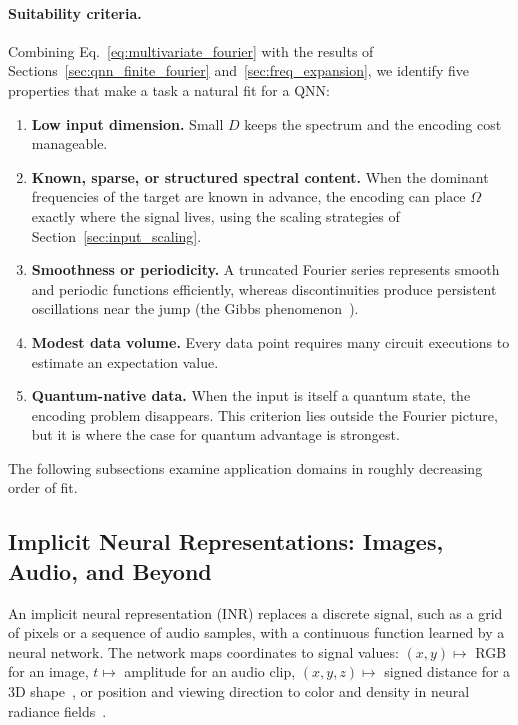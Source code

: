 \documentclass[12pt]{article}
\numberwithin{equation}{section}  %
\begin{document}
\paragraph{Suitability criteria.} Combining Eq.~\eqref{eq:multivariate_fourier} with the results of Sections~\ref{sec:qnn_finite_fourier} and~\ref{sec:freq_expansion}, we identify five properties that make a task a natural fit for a QNN:
\begin{enumerate}
\item \textbf{Low input dimension.} Small $D$ keeps the spectrum and the encoding cost manageable.
\item \textbf{Known, sparse, or structured spectral content.} When the dominant frequencies of the target are known in advance, the encoding can place $\Omega$ exactly where the signal lives, using the scaling strategies of Section~\ref{sec:input_scaling}.
\item \textbf{Smoothness or periodicity.} A truncated Fourier series represents smooth and periodic functions efficiently, whereas discontinuities produce persistent oscillations near the jump (the Gibbs phenomenon~\cite{stein2003fourier}).
\item \textbf{Modest data volume.} Every data point requires many circuit executions to estimate an expectation value.
\item \textbf{Quantum-native data.} When the input is itself a quantum state, the encoding problem disappears. This criterion lies outside the Fourier picture, but it is where the case for quantum advantage is strongest.
\end{enumerate}
The following subsections examine application domains in roughly decreasing order of fit.

\subsection{Implicit Neural Representations: Images, Audio, and Beyond}
\label{sec:app_inr}

An implicit neural representation (INR) replaces a discrete signal, such as a grid of pixels or a sequence of audio samples, with a continuous function learned by a neural network. The network maps coordinates to signal values: $(x, y) \mapsto$ RGB for an image, $t \mapsto$ amplitude for an audio clip, $(x, y, z) \mapsto$ signed distance for a 3D shape~\cite{park2019deepsdf}, or position and viewing direction to color and density in neural radiance fields~\cite{mildenhall2020nerf}.
\end{document}
